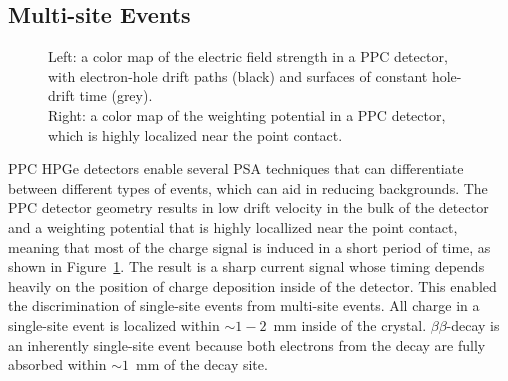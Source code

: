 \documentclass[/main.tex]{subfiles}
\begin{document}
\subsection{Multi-site Events} \label{sec:avse}
\begin{figure}[h]
  \centering
  \caption[Electric field model of a PPC detector]{\label{fig:ppcdet}
    Left: a color map of the electric field strength in a PPC detector, with electron-hole drift paths (black) and surfaces of constant hole-drift time (grey).\\
    Right: a color map of the weighting potential in a PPC detector, which is highly localized near the point contact.
  }
\end{figure}
PPC HPGe detectors enable several PSA techniques that can differentiate between different types of events, which can aid in reducing backgrounds.
The PPC detector geometry results in low drift velocity in the bulk of the detector and a weighting potential that is highly locallized near the point contact, meaning that most of the charge signal is induced in a short period of time, as shown in Figure~\ref{fig:ppcdet}.
The result is a sharp current signal whose timing depends heavily on the position of charge deposition inside of the detector.
This enabled the discrimination of single-site events from multi-site events.
All charge in a single-site event is localized within $\sim1-2$~mm inside of the crystal.
$\beta\beta$-decay is an inherently single-site event because both electrons from the decay are fully absorbed within $\sim1$~mm of the decay site.
\end{document}
